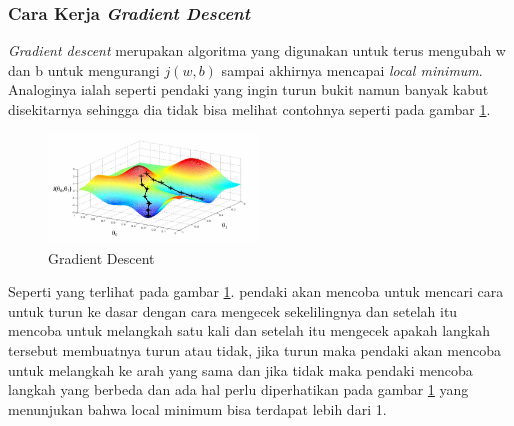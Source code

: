 \subsubsection{Cara Kerja \textit{Gradient Descent}} \label{II.carakerjagradientdescent}
\textit{Gradient descent} merupakan algoritma yang digunakan untuk terus mengubah w dan b untuk mengurangi $j(w,b)$ sampai akhirnya mencapai \textit{local minimum}\cite{hochreiter2001learning}. Analoginya ialah seperti pendaki yang ingin turun bukit namun banyak kabut disekitarnya sehingga dia tidak bisa melihat contohnya seperti pada gambar \ref{fig:2.gradientdescent}.
\begin{figure}[H] %
    \centering
    \includegraphics[width=0.5\textwidth]{figure/gradient descent.png}
    \caption{Gradient Descent}
    \label{fig:2.gradientdescent}
\end{figure}
Seperti yang terlihat pada gambar \ref{fig:2.gradientdescent}. pendaki akan mencoba untuk mencari cara untuk turun ke dasar dengan cara mengecek sekelilingnya dan setelah itu mencoba untuk melangkah satu kali dan setelah itu mengecek apakah langkah tersebut membuatnya turun atau tidak, jika turun maka pendaki akan mencoba untuk melangkah ke arah yang sama dan jika tidak maka pendaki mencoba langkah yang berbeda dan ada hal perlu diperhatikan pada gambar \ref{fig:2.gradientdescent} yang menunjukan bahwa local minimum bisa terdapat lebih dari 1\cite{ruder2016overview}.

